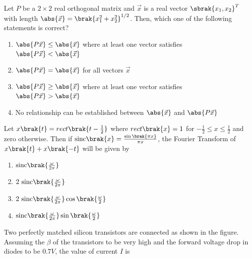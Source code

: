 \item Let $P$ be a $2 \times 2$ real orthogonal matrix and $\vec{x}$ is a real vector $\sbrak{x_1, x_2}^T$ with length $\abs{\vec{x}} = \brak{x_1^2 + x_2^2}^{1/2}$. Then, which one of the following statements is correct?  

        \begin{enumerate}
            \item $\abs{P\vec{x}} \leq \abs{\vec{x}}$ where at least one vector satisfies $\abs{P\vec{x}} < \abs{\vec{x}}$
            \item $\abs{P\vec{x}} = \abs{\vec{x}}$ for all vectors $\vec{x}$
            \item $\abs{P\vec{x}} \geq \abs{\vec{x}}$ where at least one vector satisfies $\abs{P\vec{x}} > \abs{\vec{x}}$
            \item No relationship can be established between $\abs{\vec{x}}$ and $\abs{P\vec{x}}$
        \end{enumerate}


    \item Let $x\brak{t} = rect\brak{t - \frac{1}{2}}$ where $rect\brak{x} = 1$ for $-\frac{1}{2} \leq x \leq \frac{1}{2}$ and zero otherwise. Then if $\text{sinc}\brak{x} = \frac{\sin\brak{\pi x}}{\pi x}$, the Fourier Transform of $x\brak{t} + x\brak{-t}$ will be given by
        \begin{enumerate}
            \item $\text{sinc}\brak{\frac{\omega}{2\pi}}$
            \item $2\text{ sinc}\brak{\frac{\omega}{2\pi}}$
            \item $2\text{ sinc}\brak{\frac{\omega}{2\pi}} \cos\brak{\frac{\omega}{2}}$
            \item $\text{sinc}\brak{\frac{\omega}{2\pi}} \sin\brak{\frac{\omega}{2}}$
        \end{enumerate}

    \item Two perfectly matched silicon transistors are connected as shown in the figure. Assuming the $\beta$ of the transistors to be very high and the forward voltage drop in diodes to be  $0.7V$, the value of current $I$ is

